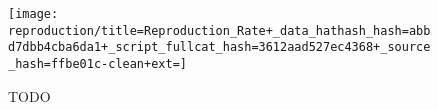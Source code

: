 \begin{figure*}[!htbp]
\begin{center}

\texttt{[image: reproduction/title=Reproduction\_Rate+\_data\_hathash\_hash=abbd7dbb4cba6da1+\_script\_fullcat\_hash=3612aad527ec4368+\_source\_hash=ffbe01c-clean+ext=]}

\caption{
TODO
}
\label{fig:reproduction}
\end{center}
\end{figure*}
